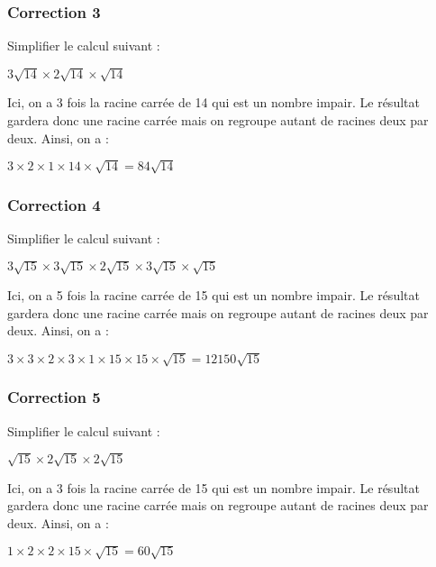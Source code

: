 \documentclass[15pt, mathserif]{beamer}
\begin{document}
\begin{frame}
\vspace{-10mm}
	\frametitle{Correction 3}
Simplifier le calcul suivant : 
 
 $3\sqrt{14} \times 2\sqrt{14} \times \sqrt{14} $
 
 Ici, on a 3 fois la racine carrée de 14 qui est un nombre impair. Le résultat gardera donc une racine carrée mais on regroupe autant de racines deux par deux. Ainsi, on a : 
 
 $ 3\times 2\times 1\times 14\times \sqrt{14}=84\sqrt{14}$\end{frame}


\begin{frame}
\vspace{-10mm}
	\frametitle{Correction 4}
Simplifier le calcul suivant : 
 
 $3\sqrt{15} \times 3\sqrt{15} \times 2\sqrt{15} \times 3\sqrt{15} \times \sqrt{15} $
 
 Ici, on a 5 fois la racine carrée de 15 qui est un nombre impair. Le résultat gardera donc une racine carrée mais on regroupe autant de racines deux par deux. Ainsi, on a : 
 
 $ 3\times 3\times 2\times 3\times 1\times 15\times 15\times \sqrt{15}=12150 \sqrt{15}$\end{frame}


\begin{frame}
\vspace{-10mm}
	\frametitle{Correction 5}
Simplifier le calcul suivant : 
 
 $\sqrt{15} \times 2\sqrt{15} \times 2\sqrt{15} $
 
 Ici, on a 3 fois la racine carrée de 15 qui est un nombre impair. Le résultat gardera donc une racine carrée mais on regroupe autant de racines deux par deux. Ainsi, on a : 
 
 $ 1\times 2\times 2\times 15\times \sqrt{15}=60\sqrt{15}$\end{frame}
\end{document}

